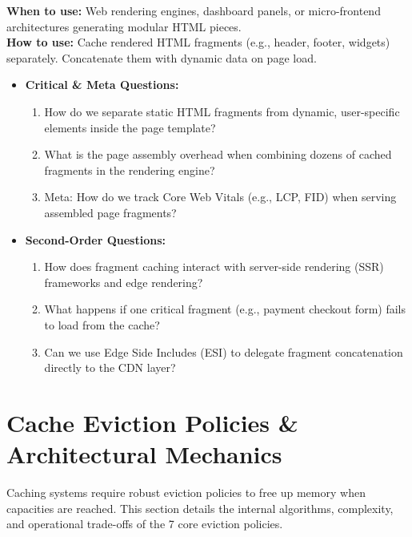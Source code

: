 \documentclass[11pt,a4paper]{article}
\theoremstyle{definition}
\begin{document}
\noindent
\textbf{When to use:} Web rendering engines, dashboard panels, or micro-frontend architectures generating modular HTML pieces.\\
\textbf{How to use:} Cache rendered HTML fragments (e.g., header, footer, widgets) separately. Concatenate them with dynamic data on page load.
\begin{itemize}[leftmargin=*]
  \item[] \textbf{Critical \& Meta Questions:}
  \begin{enumerate}
  \item How do we separate static HTML fragments from dynamic, user-specific elements inside the page template?
  \item What is the page assembly overhead when combining dozens of cached fragments in the rendering engine?
  \item Meta: How do we track Core Web Vitals (e.g., LCP, FID) when serving assembled page fragments?
  \end{enumerate}
  \item[] \textbf{Second-Order Questions:}
  \begin{enumerate}
  \item How does fragment caching interact with server-side rendering (SSR) frameworks and edge rendering?
  \item What happens if one critical fragment (e.g., payment checkout form) fails to load from the cache?
  \item Can we use Edge Side Includes (ESI) to delegate fragment concatenation directly to the CDN layer?
  \end{enumerate}
\end{itemize}
\medskip

\section{Cache Eviction Policies \& Architectural Mechanics}\label{sec:eviction-policies}
Caching systems require robust eviction policies to free up memory when capacities are reached. This section details the internal algorithms, complexity, and operational trade-offs of the 7 core eviction policies.
\end{document}
